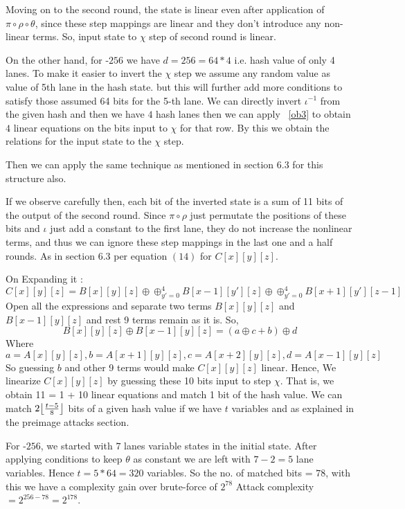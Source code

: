 Moving on to the second round, the state is linear even after application of $\pi \circ \rho \circ \theta$, since these step mappings are linear and they don't introduce any non-linear terms. So, input state to $\chi$ step of second round is linear.

On the other hand, for \KECCAK-$256$ we have $d = 256 = 64*4$ i.e. hash value of only 4 lanes. To make it easier to invert the $\chi$ step we assume any random value as value of 5th lane in the hash state. but this will further add more conditions to satisfy those assumed 64 bits for the 5-th lane.
We can directly invert $\iota^{-1}$ from the given hash and then we have $4$ hash lanes then we can apply ~\ref{ob3} to obtain $4$ linear equations on the bits input to $\chi$ for that row. By this we obtain the relations for the input state to the $\chi$ step.

Then we can apply the same technique as mentioned in section 6.3 \cite{guo2016linear} for this structure also. 

If we observe carefully then, each bit of the inverted state is a sum of 11 bits of the output of the second round. Since $\pi \circ \rho$ just permutate the positions of these bits and $\iota$ just add a constant to the first lane, they do not increase the nonlinear terms, and thus we can ignore these step mappings in the last one and a half rounds. As in section 6.3 per equation $(14)$ for $C[x][y][z]$. 

On Expanding it :
    \[
        C[x][y][z] = B[x][y][z] \oplus \oplus_{y' = 0}^{4} B[x-1][y'][z] \oplus \oplus_{y' = 0}^{4} B[x+1][y'][z-1]
    \]
    Open all the expressions and separate two terms $B[x][y][z]$ and $B[x-1][y][z]$ and rest 9 terms remain as it is.
    So, \[ B[x][y][z] \oplus B[x-1][y][z] = (a \oplus c + b) \oplus d
    \]
    Where \[
        a = A[x][y][z], b = A[x + 1][y][z], c = A[x + 2][y][z], d = A[x - 1][y][z]
    \]
    So guessing $b$ and other 9 terms would make $C[x][y][z]$ linear. Hence, We linearize $C[x][y][z]$ by guessing these 10 bits input to step $\chi$. That is, we obtain 11 = 1 + 10 linear equations and match 1 bit of the hash value.
We can match $2\floor*{\frac{t - 5}{8}}$ bits of a given hash value if we have $t$ variables \cite{guo2016linear} and as explained in the preimage attacks section.

For \Keccak-$256$, we started with $7$ lanes variable states in the initial state. After applying conditions to keep $\theta$ as constant we are left with $7 - 2 = 5$ lane variables. Hence $t = 5*64 = 320$ variables.
So the no. of matched bits = $78$, with this we have a complexity gain over brute-force of $2^{78}$
Attack complexity $ = 2^{256 - 78} = 2^{178}$.

